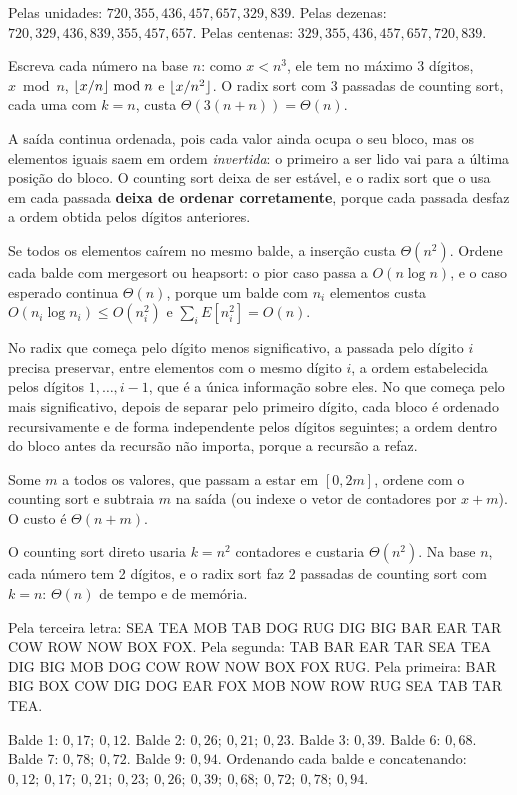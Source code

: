  Pelas unidades: $720,355,436,457,657,329,839$. Pelas dezenas: $720,329,436,839,355,457,657$. Pelas centenas: $329,355,436,457,657,720,839$.

 Escreva cada número na base $n$: como $x<n^3$, ele tem no máximo 3 dígitos, $x\bmod n$, $\lfloor x/n\rfloor\bmod n$ e $\lfloor x/n^2\rfloor$. O radix sort com 3 passadas de counting sort, cada uma com $k=n$, custa $\Theta(3(n+n))=\Theta(n)$.

 A saída continua ordenada, pois cada valor ainda ocupa o seu bloco, mas os elementos iguais saem em ordem \emph{invertida}: o primeiro a ser lido vai para a última posição do bloco. O counting sort deixa de ser estável, e o radix sort que o usa em cada passada \textbf{deixa de ordenar corretamente}, porque cada passada desfaz a ordem obtida pelos dígitos anteriores.

 Se todos os elementos caírem no mesmo balde, a inserção custa $\Theta(n^2)$. Ordene cada balde com mergesort ou heapsort: o pior caso passa a $O(n\log n)$, e o caso esperado continua $\Theta(n)$, porque um balde com $n_i$ elementos custa $O(n_i\log n_i)\le O(n_i^2)$ e $\sum_iE[n_i^2]=O(n)$.

 No radix que começa pelo dígito menos significativo, a passada pelo dígito $i$ precisa preservar, entre elementos com o mesmo dígito $i$, a ordem estabelecida pelos dígitos $1,\dots,i-1$, que é a única informação sobre eles. No que começa pelo mais significativo, depois de separar pelo primeiro dígito, cada bloco é ordenado recursivamente e de forma independente pelos dígitos seguintes; a ordem dentro do bloco antes da recursão não importa, porque a recursão a refaz.

 Some $m$ a todos os valores, que passam a estar em $[0,2m]$, ordene com o counting sort e subtraia $m$ na saída (ou indexe o vetor de contadores por $x+m$). O custo é $\Theta(n+m)$.

 O counting sort direto usaria $k=n^2$ contadores e custaria $\Theta(n^2)$. Na base $n$, cada número tem 2 dígitos, e o radix sort faz 2 passadas de counting sort com $k=n$: $\Theta(n)$ de tempo e de memória.

 Pela terceira letra: SEA TEA MOB TAB DOG RUG DIG BIG BAR EAR TAR COW ROW NOW BOX FOX. Pela segunda: TAB BAR EAR TAR SEA TEA DIG BIG MOB DOG COW ROW NOW BOX FOX RUG. Pela primeira: BAR BIG BOX COW DIG DOG EAR FOX MOB NOW ROW RUG SEA TAB TAR TEA.

 Balde 1: $0{,}17;\ 0{,}12$. Balde 2: $0{,}26;\ 0{,}21;\ 0{,}23$. Balde 3: $0{,}39$. Balde 6: $0{,}68$. Balde 7: $0{,}78;\ 0{,}72$. Balde 9: $0{,}94$. Ordenando cada balde e concatenando: $0{,}12;\ 0{,}17;\ 0{,}21;\ 0{,}23;\ 0{,}26;\ 0{,}39;\ 0{,}68;\ 0{,}72;\ 0{,}78;\ 0{,}94$.

